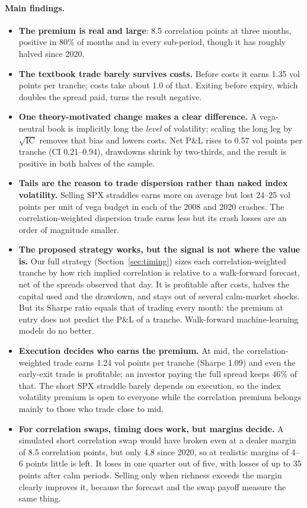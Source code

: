 \paragraph{Main findings.}
\begin{itemize}
  \item \textbf{The premium is real and large}: 8.5 correlation points at three months, positive in 80\% of months and in every sub-period, though it has roughly halved since 2020.
  \item \textbf{The textbook trade barely survives costs.} Before costs it earns 1.35 vol points per tranche; costs take about 1.0 of that. Exiting before expiry, which doubles the spread paid, turns the result negative.
  \item \textbf{One theory-motivated change makes a clear difference.} A vega-neutral book is implicitly long the \emph{level} of volatility; scaling the long leg by $\sqrt{\text{IC}}$ removes that bias and lowers costs. Net P\&L rises to 0.57 vol points per tranche (CI 0.21--0.94), drawdowns shrink by two-thirds, and the result is positive in both halves of the sample.
  \item \textbf{Tails are the reason to trade dispersion rather than naked index volatility.} Selling SPX straddles earns more on average but lost 24--25 vol points per unit of vega budget in each of the 2008 and 2020 crashes. The correlation-weighted dispersion trade earns less but its crash losses are an order of magnitude smaller.
  \item \textbf{The proposed strategy works, but the signal is not where the value is.} Our full strategy (Section~\ref{sec:timing}) sizes each correlation-weighted tranche by how rich implied correlation is relative to a walk-forward forecast, net of the spreads observed that day. It is profitable after costs, halves the capital used and the drawdown, and stays out of several calm-market shocks. But its Sharpe ratio equals that of trading every month: the premium at entry does not predict the P\&L of a tranche. Walk-forward machine-learning models do no better.
  \item \textbf{Execution decides who earns the premium.} At mid, the correlation-weighted trade earns 1.24 vol points per tranche (Sharpe 1.09) and even the early-exit trade is profitable; an investor paying the full spread keeps 46\% of that. The short SPX straddle barely depends on execution, so the index volatility premium is open to everyone while the correlation premium belongs mainly to those who trade close to mid.
  \item \textbf{For correlation swaps, timing does work, but margins decide.} A simulated short correlation swap would have broken even at a dealer margin of 8.5 correlation points, but only 4.8 since 2020, so at realistic margins of 4--6 points little is left. It loses in one quarter out of five, with losses of up to 35 points after calm periods. Selling only when richness exceeds the margin clearly improves it, because the forecast and the swap payoff measure the same thing.
\end{itemize}

